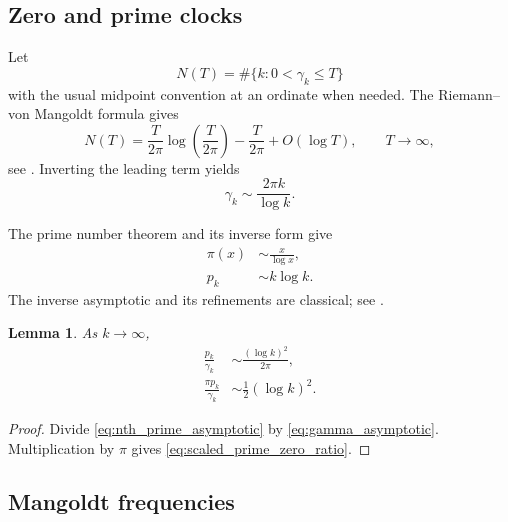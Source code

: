 \documentclass[11pt]{amsart}
\numberwithin{equation}{section}
\theoremstyle{plain}
\newtheorem{lemma}[theorem]{Lemma}
\theoremstyle{definition}
\theoremstyle{remark}
\begin{document}
\subsection{Zero and prime clocks}
\label{subsec:zero_prime_clocks}

Let
\begin{equation}
 N(T)=\#\{k:0<\gamma_k\leq T\}
 \label{eq:zero_counting_function}
\end{equation}
with the usual midpoint convention at an ordinate when needed.  The
Riemann--von Mangoldt formula gives
\begin{equation}
 N(T)
 =\frac{T}{2\pi}\log\left(\frac{T}{2\pi}\right)
 -\frac{T}{2\pi}
 +O(\log T),
 \qquad T\to\infty,
 \label{eq:riemann_von_mangoldt}
\end{equation}
see \cite[Chapter~9]{Titchmarsh1986}.  Inverting the leading term yields
\begin{equation}
 \gamma_k\sim\frac{2\pi k}{\log k}.
 \label{eq:gamma_asymptotic}
\end{equation}

The prime number theorem and its inverse form give
\begin{align}
 \pi(x)&\sim\frac{x}{\log x},
 \label{eq:pnt_pi}
 \\
 p_k&\sim k\log k.
 \label{eq:nth_prime_asymptotic}
\end{align}
The inverse asymptotic and its refinements are classical; see
\cite{Ingham1932,AriasToulisse2013}.

\begin{lemma}
\label{lem:prime_zero_ratio}
As $k\to\infty$,
\begin{align}
 \frac{p_k}{\gamma_k}
 &\sim\frac{(\log k)^2}{2\pi},
 \label{eq:prime_zero_ratio}
 \\
 \frac{\pi p_k}{\gamma_k}
 &\sim\frac12(\log k)^2.
 \label{eq:scaled_prime_zero_ratio}
\end{align}
\end{lemma}

\begin{proof}
Divide \eqref{eq:nth_prime_asymptotic} by
\eqref{eq:gamma_asymptotic}.  Multiplication by $\pi$ gives
\eqref{eq:scaled_prime_zero_ratio}.
\end{proof}

\subsection{Mangoldt frequencies}
\label{subsec:mangoldt_frequencies}
\end{document}
